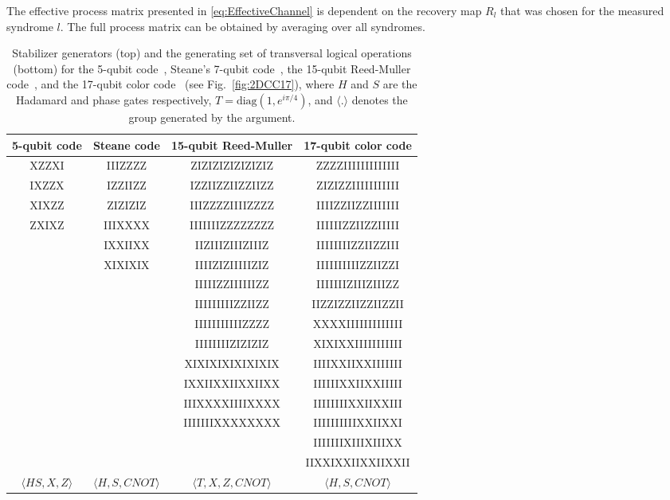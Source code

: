 \documentclass[pra,longbibliography,twocolumn,showpacs,nofootinbib,superscriptaddress,notitlepage]{revtex4-1}
\begin{document}
The effective process matrix presented in \cref{eq:EffectiveChannel} is dependent on the recovery map $R_{l}$ that was chosen for the measured syndrome $l$. The full process matrix can be obtained by averaging over all syndromes. 

\begin{table*}
\begin{tabular}{ c|c|c|c}
 5-qubit code & Steane code & 15-qubit Reed-Muller & 17-qubit color code \\ \hline
     XZZXI      &   IIIZZZZ     & ZIZIZIZIZIZIZIZ & ZZZZIIIIIIIIIIIII \\
     IXZZX      &   IZZIIZZ     & IZZIIZZIIZZIIZZ & ZIZIZZIIIIIIIIIII \\
     XIXZZ      &   ZIZIZIZ     & IIIZZZZIIIIZZZZ & IIIIZZIIZZIIIIIII \\
     ZXIXZ      &   IIIXXXX    & IIIIIIIZZZZZZZZ & IIIIIIZZIIZZIIIII \\
	             &   IXXIIXX    & IIZIIIZIIIZIIIZ     & IIIIIIIIZZIIZZIII \\
                     &   XIXIXIX    & IIIIZIZIIIIIZIZ     & IIIIIIIIIIZZIIZZI \\
                     &                   & IIIIIZZIIIIIIZZ     &  IIIIIIIZIIIZIIIZZ \\
                     &                   & IIIIIIIIIZZIIZZ     &  IIZZIZZIIZZIIZZII \\
                     &                   & IIIIIIIIIIIZZZZ     &  XXXXIIIIIIIIIIIII \\
                     &                   & IIIIIIIIZIZIZIZ     &  XIXIXXIIIIIIIIIII \\
                     &                   & XIXIXIXIXIXIXIX  &  IIIIXXIIXXIIIIIII \\
                     &                   & IXXIIXXIIXXIIXX  &  IIIIIIXXIIXXIIIII \\
                     &                   & IIIXXXXIIIIXXXX  &  IIIIIIIIXXIIXXIII \\
                     &                   & IIIIIIIXXXXXXXX  &  IIIIIIIIIIXXIIXXI \\
                    &                    &                             &  IIIIIIIXIIIXIIIXX  \\
                    &                    &                             &  IIXXIXXIIXXIIXXII  \\\hline
$\langle HS,X,Z\rangle$ & $\langle H,S,CNOT\rangle$ & $\langle 
T,X,Z,CNOT\rangle$ & $\langle H,S,CNOT\rangle$
\end{tabular}
\caption{Stabilizer generators (top) and the generating set of transversal logical operations (bottom) for the 5-qubit 
code~\cite{LMPZ96}, Steane's 7-qubit code~\cite{Steane96b}, the 15-qubit Reed-Muller code~\cite{ADP14}, and the 17-qubit color code~\cite{Bombin15} (see Fig.~\ref{fig:2DCC17}), where $H$ and $S$ are the Hadamard and phase gates respectively, $T = \mathrm{diag}(1,e^{i\pi/4})$, and $\langle.\rangle$ denotes the group generated by the argument.}
\label{tab:StabilizerGeneratorsLists}
\end{table*}
\end{document}
